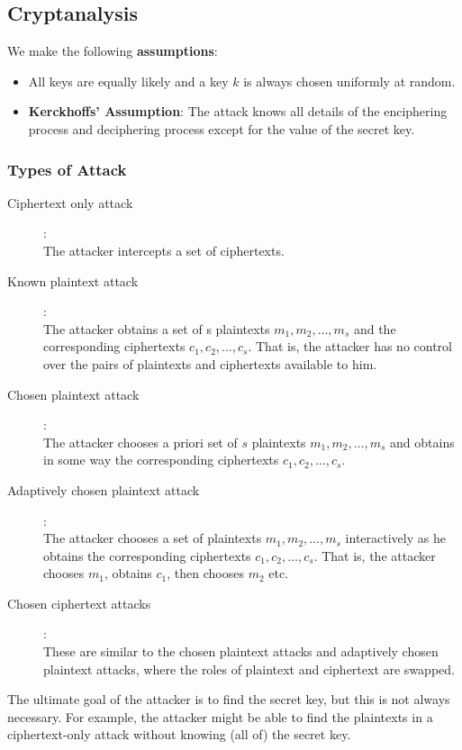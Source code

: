 \subsection{Cryptanalysis}

We make the following \textbf{assumptions}:
\begin{itemize}
\item All keys are equally likely and a key $k$ is always chosen
  uniformly at random.
\item \textbf{Kerckhoffs’ Assumption}: The attack knows all details of
  the enciphering process and deciphering process except for the
  value of the secret key.
\end{itemize}

\subsubsection{Types of Attack}

\begin{description}
\item[Ciphertext only attack]:\\
  The attacker intercepts a set of ciphertexts.
\item[Known plaintext attack]:\\
  The attacker obtains a set of s plaintexts $m_1 , m_2 , \ldots, m_s$
  and the corresponding ciphertexts $c_1 , c_2 , \ldots, c_s$. That
  is, the attacker has no control over the pairs of plaintexts and
  ciphertexts available to him.
\item[Chosen plaintext attack]:\\
  The attacker chooses a priori set of $s$ plaintexts $m_1 , m_2 ,
  \ldots, m_s$ and obtains in some way the corresponding ciphertexts
  $c_1 , c_2 , \ldots, c_s$.
\item[Adaptively chosen plaintext attack]:\\
  The attacker chooses a set of plaintexts $m_1 , m_2 , \ldots, m_s$
  interactively as he obtains the corresponding ciphertexts $c_1 , c_2
  , \ldots, c_s$. That is, the attacker chooses $m_1$, obtains $c_1$,
  then chooses $m_2$ etc.
\item[Chosen ciphertext attacks]:\\
  These are similar to the chosen plaintext attacks and adaptively
  chosen plaintext attacks, where the roles of plaintext and
  ciphertext are swapped.
\end{description}

The ultimate goal of the attacker is to find the secret key, but this
is not always necessary. For example, the attacker might be able to
find the plaintexts in a ciphertext-only attack without knowing (all
of) the secret key.


